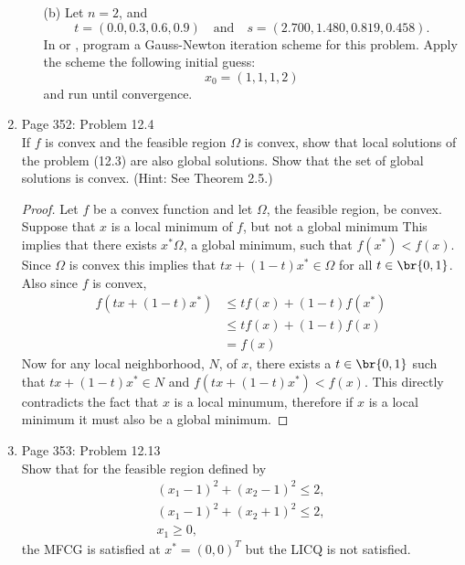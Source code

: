 \documentclass[11pt, oneside]{article}
\begin{document}
\begin{enumerate}
\begin{enumerate}
      \item[(b)]
        Let $n = 2$, and
        \[
          t = (0.0, 0.3, 0.6, 0.9) \quad \text{and} \quad s = (2.700, 1.480, 0.819, 0.458).
        \]
        In \MATLAB or \PYTHON, program a Gauss-Newton iteration scheme for this
        problem.
        Apply the scheme the following initial guess:
        \[
          x_0 = (1, 1, 1, 2)
        \]
        and run until convergence.
    \end{enumerate}

  \item %
    Page 352: Problem 12.4 \\
    If $f$ is convex and the feasible region $\Omega$ is convex, show that local
    solutions of the problem (12.3) are also global solutions.
    Show that the set of global solutions is convex.
    (Hint: See Theorem 2.5.)

    \begin{proof}
      Let $f$ be a convex function and let $\Omega$, the feasible region, be
      convex.
      Suppose that $x$ is a local minimum of $f$, but not a global minimum
      This implies that there exists $x^* \Omega$, a global minimum, such that
      $f(x^*) < f(x)$.
      Since $\Omega$ is convex this implies that $tx + (1-t)x^* \in \Omega$
      for all $t \in \br{0, 1}$.
      Also since $f$ is convex,
      \begin{align*}
        f(tx + (1-t)x^*) &\le tf(x) + (1-t)f(x^*) \\
        &\le tf(x) + (1-t)f(x) \\
        &= f(x)
      \end{align*}
      Now for any local neighborhood, $N$, of $x$, there exists a
      $t \in \br{0, 1}$ such that $tx + (1-t)x^* \in N$ and
      $f(tx + (1-t)x^*) < f(x)$.
      This directly contradicts the fact that $x$ is a local minumum, therefore
      if $x$ is a local minimum it must also be a global minimum.
    \end{proof}

  \item %
    Page 353: Problem 12.13 \\
    Show that for the feasible region defined by
    \begin{align*}
      (x_1 - 1)^2 + (x_2 - 1)^2 \le 2, \\
      (x_1 - 1)^2 + (x_2 + 1)^2 \le 2, \\
      x_1 \ge 0,
    \end{align*}
    the MFCG is satisfied at $x^* = (0, 0)^T$ but the LICQ is not satisfied.


\end{enumerate}
\end{document}
